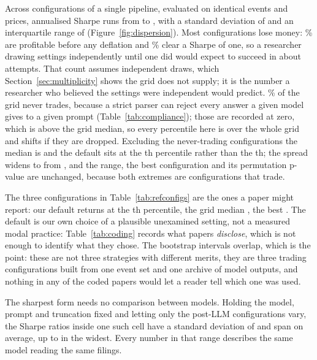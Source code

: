 \documentclass[sigconf]{acmart}
\begin{document}
Across \NumConfigs{} configurations of a single pipeline, evaluated on identical events and prices,
annualised Sharpe runs from \SharpeMin{} to \SharpeMax{}, with a standard deviation of \SharpeSD{}
and an interquartile range of \SharpeIQR{} (Figure~\ref{fig:dispersion}). Most configurations lose money: \FracPositive{}\% are profitable before any deflation and
\FracAboveOne{}\% clear a Sharpe of one, so a researcher drawing settings independently until one
did would expect to succeed in about \TriesToOne{} attempts. That count assumes independent draws,
which Section~\ref{sec:multiplicity} shows the grid does not supply; it is the number a researcher
who believed the settings were independent would predict. \FracNeverTrades{}\% of the grid never
trades, because a strict parser can reject every answer a given model gives to a given prompt
(Table~\ref{tab:compliance}); those are recorded at zero, which is above the grid median, so every
percentile here is over the whole grid and shifts if they are dropped. Excluding the never-trading
configurations the median is \SharpeMedianLive{} and the default sits at the
\DefaultPercentileLive{}th percentile rather than the \DefaultPercentile{}th; the spread widens to
\StdSDLive{} from \SharpeSD{}, and the range, the best configuration and its permutation p-value
are unchanged, because both extremes are configurations that trade.

The three configurations in Table~\ref{tab:refconfigs} are the ones a paper might report: our
default returns \SharpeDefault{} at the \DefaultPercentile{}th percentile, the grid median
\SharpeMedian{}, the best \SharpeBest{}. The
default is our own choice of a plausible unexamined setting, not a measured modal practice:
Table~\ref{tab:coding} records what papers \emph{disclose}, which is not enough to identify what
they chose. The bootstrap intervals overlap, which is the point: these are not three strategies with
different merits, they are three trading configurations built from one event set and one archive of
model outputs, and nothing in any of the coded papers would let a reader tell which one was used.

The sharpest form needs no comparison between models. Holding the model, prompt and truncation fixed
and letting only the \NumPostConfigs{} post-LLM configurations vary, the Sharpe ratios inside one
such cell have a standard deviation of \PostOnlySD{} and span \PostOnlyRange{} on average, up to
\PostOnlyRangeMax{} in the widest. Every number in that range describes the same
model reading the same filings.
\end{document}
